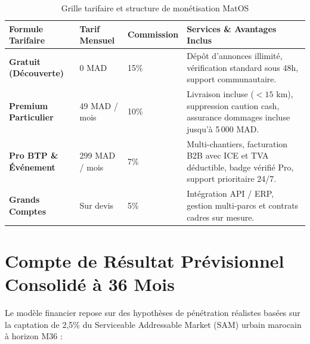 \documentclass[11pt,a4paper]{report}
\begin{document}
\begin{table}[h!]
\centering
\small
\begin{tabularx}{\textwidth}{p{3.5cm} p{2.2cm} p{2.2cm} X}
\toprule
\textbf{Formule Tarifaire} & \textbf{Tarif Mensuel} & \textbf{Commission} & \textbf{Services \& Avantages Inclus} \\
\midrule
\textbf{Gratuit (Découverte)} & 0 MAD & 15\% & Dépôt d'annonces illimité, vérification standard sous 48h, support communautaire. \\
\addlinespace
\textbf{Premium Particulier} & 49 MAD / mois & 10\% & Livraison incluse ($<15$ km), suppression caution cash, assurance dommages incluse jusqu'à 5\,000 MAD. \\
\addlinespace
\textbf{Pro BTP \& Événement} & 299 MAD / mois & 7\% & Multi-chantiers, facturation B2B avec ICE et TVA déductible, badge vérifié Pro, support prioritaire 24/7. \\
\addlinespace
\textbf{Grands Comptes} & Sur devis & 5\% & Intégration API / ERP, gestion multi-parcs et contrats cadres sur mesure. \\
\bottomrule
\end{tabularx}
\caption{Grille tarifaire et structure de monétisation MatOS}
\end{table}

\section{Compte de Résultat Prévisionnel Consolidé à 36 Mois}
Le modèle financier repose sur des hypothèses de pénétration réalistes basées sur la captation de 2,5\% du Serviceable Addressable Market (SAM) urbain marocain à horizon M36 :
\end{document}
